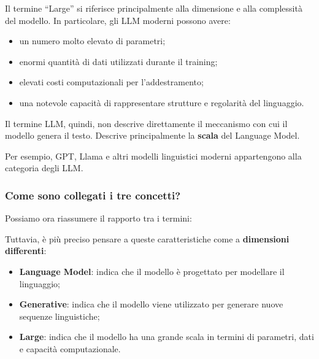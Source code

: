 Il termine ``Large'' si riferisce principalmente alla dimensione e alla complessità del modello. In particolare, gli LLM moderni possono avere:

\begin{itemize}
\item un numero molto elevato di parametri;
\item enormi quantità di dati utilizzati durante il training;
\item elevati costi computazionali per l'addestramento;
\item una notevole capacità di rappresentare strutture e regolarità del linguaggio.
\end{itemize}

Il termine LLM, quindi, non descrive direttamente il meccanismo con cui il modello genera il testo. Descrive principalmente la \textbf{scala} del Language Model.

Per esempio, GPT, Llama e altri modelli linguistici moderni appartengono alla categoria degli LLM.

\subsubsection{Come sono collegati i tre concetti?}

Possiamo ora riassumere il rapporto tra i termini:

\begin{center}
\end{center}

Tuttavia, è più preciso pensare a queste caratteristiche come a \textbf{dimensioni differenti}:

\begin{itemize}
\item \textbf{Language Model}: indica che il modello è progettato per modellare il linguaggio;
\item \textbf{Generative}: indica che il modello viene utilizzato per generare nuove sequenze linguistiche;
\item \textbf{Large}: indica che il modello ha una grande scala in termini di parametri, dati e capacità computazionale.
\end{itemize}

